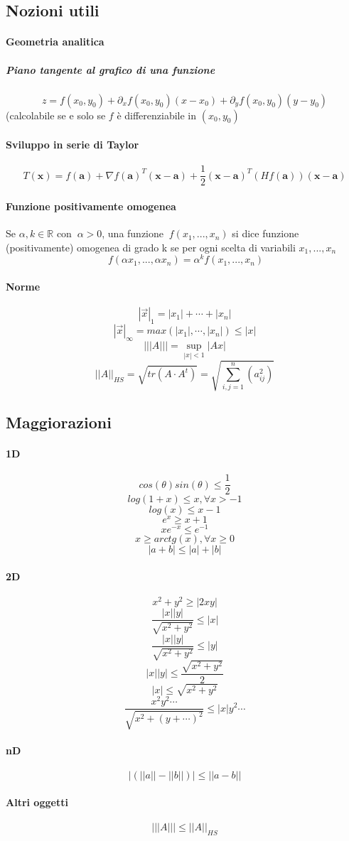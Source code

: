 \documentclass[a4paper,12pt]{book}
\begin{document}
\subsection{Nozioni utili}
\paragraph{Geometria analitica}
\subparagraph{Piano tangente al grafico di una funzione}
$$z = f(x_0, y_0) + \partial_x f(x_0, y_0) (x-x_0) + \partial_y f(x_0, y_0) (y - y_0) $$
(calcolabile se e solo se $f$ è differenziabile in $(x_0, y_0)$

\paragraph{Sviluppo in serie di Taylor}

$$T(\mathbf{x}) = f(\mathbf{a}) + \nabla f(\mathbf{a})^T (\mathbf{x} - \mathbf{a}) + \frac{1}{2} (\mathbf{x} - \mathbf{a})^T (H f(\mathbf{a})) (\mathbf{x} - \mathbf{a})$$

\paragraph{Funzione positivamente omogenea}
Se $\alpha, k \in \mathbb{R}$ con $\ \alpha > 0 $, una funzione $\ f(x_{1}, . . ., x_{n})$ si dice funzione (positivamente) omogenea di grado k se per ogni scelta di variabili $x_1,...,x_n$
$$\ f(\alpha x_{1}, . . ., \alpha x_{n})= {\alpha}^{k}f(x_{1}, . . ., x_{n})$$

\paragraph{Norme}
$$|\vec{x}|_1 = |x_1|+\cdots+|x_n|$$
$$|\vec{x}|_\infty = max( |x_1|,\cdots,|x_n|) \leq |x|$$
$$|||A||| = \sup_{|x|<1}|Ax|$$
$$||A||_{HS} = \sqrt{tr(A\cdot A^t)} = \sqrt{\sum_{i,j=1}^n (a_{ij}^2)}$$

\subsection{Maggiorazioni}
\paragraph{1D}
$$cos(\theta)sin(\theta) \leq \frac{1}{2}$$
$$ log(1+x) \leq x, \forall x > -1$$
$$ log(x) \leq x-1 $$
$$ e^x \geq x+1 $$
$$xe^{-x} \leq e^{-1}$$
$$x \geq arctg(x), \forall x \geq 0$$
$$|a+b|\leq |a|+|b|$$
\paragraph{2D}
$$x^2+y^2\geq |2xy|$$
$$\dfrac{|x||y|}{\sqrt{x^2+y^2}} \leq |x|$$
$$\dfrac{|x||y|}{\sqrt{x^2+y^2}} \leq |y|$$
$$|x||y| \leq \dfrac{\sqrt{x^2+y^2}}{2}$$
$$|x| \leq \sqrt{x^2+y^2} $$
$$\dfrac{x^2y^2\cdots}{\sqrt{x^2+(y+\cdots)^2}} \leq |x|y^2\cdots $$
\paragraph{nD}
$$|(||a||-||b||)|\leq||a-b||$$
\paragraph{Altri oggetti}
$$|||A||| \leq ||A||_{HS}$$
\end{document}
